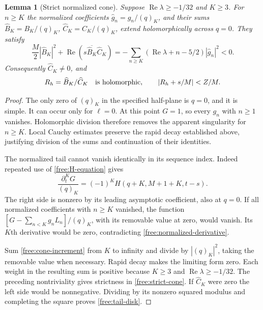 \documentclass[11pt]{article}
\numberwithin{equation}{section}
\newtheorem{lemma}[theorem]{Lemma}
\theoremstyle{definition}
\theoremstyle{remark}
\begin{document}
\begin{lemma}[Strict normalized cone]\label{free:cone}
Suppose $\operatorname{Re}\lambda\ge-1/32$ and $K\ge3$.  For $n\ge K$
the normalized coefficients $\widehat g_n=g_n/(q)_K$, and their sums
$\widehat B_K=B_K/(q)_K$, $\widehat C_K=C_K/(q)_K$, extend
holomorphically across $q=0$.  They satisfy
\begin{equation}\label{free:strict-cone}
 \frac M2|\widehat B_K|^2+
 \operatorname{Re}(s\overline{\widehat B_K}\widehat C_K)
 =-\sum_{n\ge K}(\operatorname{Re}\lambda+n-5/2)
 |\widehat g_n|^2<0.
\end{equation}
Consequently $\widehat C_K\ne0$, and
\begin{equation}\label{free:tail-disk}
 R_h=\widehat B_K/\widehat C_K\quad\hbox{is holomorphic},\qquad
 |R_h+s/M|<Z/M.
\end{equation}
\end{lemma}

\begin{proof}
The only zero of $(q)_K$ in the specified half-plane is $q=0$, and it is
simple.  It can occur only for $\ell=0$.  At this point $G=1$, so every
$g_n$ with $n\ge1$ vanishes.  Holomorphic division therefore removes
the apparent singularity for $n\ge K$.  Local Cauchy estimates preserve
the rapid decay established above, justifying division of the sums and
continuation of their identities.

The normalized tail cannot vanish identically in its sequence index.
Indeed repeated use of \eqref{free:H-equation} gives
\begin{equation}\label{free:normalized-derivative}
 \frac{\partial_t^K G}{(q)_K}
 =(-1)^KH(q+K,M+1+K,t-s).
\end{equation}
The right side is nonzero by its leading asymptotic coefficient, also at
$q=0$.  If all normalized coefficients with $n\ge K$ vanished, the
function $[G-\sum_{n<K}g_nL_n]/(q)_K$, with its removable value at zero,
would vanish.  Its $K$th derivative would be zero, contradicting
\eqref{free:normalized-derivative}.

Sum \eqref{free:cone-increment} from $K$ to infinity and divide by
$|(q)_K|^2$, taking the removable value when necessary.  Rapid decay
makes the limiting form zero.  Each weight in the resulting sum is
positive because $K\ge3$ and $\operatorname{Re}\lambda\ge-1/32$.
The preceding nontriviality gives strictness in
\eqref{free:strict-cone}.  If $\widehat C_K$ were zero the left side
would be nonnegative.  Dividing by its nonzero squared modulus and
completing the square proves \eqref{free:tail-disk}.
\end{proof}
\end{document}
